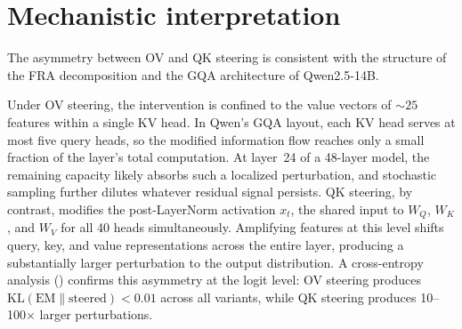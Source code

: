 \documentclass{article}
\theoremstyle{plain}
\theoremstyle{definition}
\theoremstyle{remark}
\newcommand{\WQ}{W_Q}
\newcommand{\WK}{W_K}
\newcommand{\WV}{W_V}
\begin{document}


\section{Mechanistic interpretation}
\label{sec:mechanistic}

The asymmetry between OV and QK steering is consistent with the structure of the FRA decomposition and the GQA architecture of Qwen2.5-14B.

Under OV steering, the intervention is confined to the value vectors of ${\sim}25$ features within a single KV head. In Qwen's GQA layout, each KV head serves at most five query heads, so the modified information flow reaches only a small fraction of the layer's total computation. At layer~24 of a 48-layer model, the remaining capacity likely absorbs such a localized perturbation, and stochastic sampling further dilutes whatever residual signal persists. QK steering, by contrast, modifies the post-LayerNorm activation $x_t$, the shared input to $\WQ$, $\WK$, and $\WV$ for all 40 heads simultaneously. Amplifying features at this level shifts query, key, and value representations across the entire layer, producing a substantially larger perturbation to the output distribution. A cross-entropy analysis () confirms this asymmetry at the logit level: OV steering produces $\mathrm{KL}(\text{EM} \| \text{steered}) < 0.01$ across all variants, while QK steering produces 10--100$\times$ larger perturbations.
\end{document}
